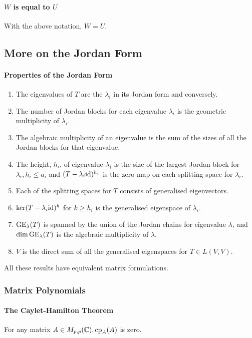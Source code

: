 \paragraph{\(W\) is equal to \(U\)}
With the above notation, \(W = U\).

\subsection{More on the Jordan Form}
\paragraph{Properties of the Jordan Form}
\begin{enumerate}[label=\alph*)]
    \item The eigenvalues of \(T\) are the \(\lambda_i\) in its Jordan form and conversely.
    \item The number of Jordan blocks for each eigenvalue \(\lambda_i\) is the geometric multiplicity of \(\lambda_i\).
    \item The algebraic multiplicity of an eigenvalue is the sum of the sizes of all the Jordan blocks for that eigenvalue.
    \item The height, \(h_i\), of eigenvalue \(\lambda_i\) is the size of the largest Jordan block for \(\lambda_i, h_i \leq a_i\) and \((T - \lambda_i\mathrm{id})^{h_i}\) is the zero map on each splitting space for \(\lambda_i\).
    \item Each of the splitting spaces for \(T\) consists of generalised eigenvectors.
    \item \(\ker(T - \lambda_i\mathrm{id})^k\) for \(k \geq h_i\) is the generalised eigenspace of \(\lambda_i\).
    \item \(\operatorname{GE}_\lambda(T)\) is spanned by the union of the Jordan chains for eigenvalue \(\lambda\), and \(\dim\operatorname{GE}_\lambda(T)\) is the algebraic multiplicity of \(\lambda\).
    \item \(V\) is the direct sum of all the generalised eigenspaces for \(T \in L(V,V)\).
\end{enumerate}
All these results have equivalent matrix formulations.

\subsubsection{Matrix Polynomials}
\paragraph{The Caylet-Hamilton Theorem}
For any matrix \(A \in M_{p,p}(\mathbb{C}), \mathrm{cp}_A(A)\) is zero.

